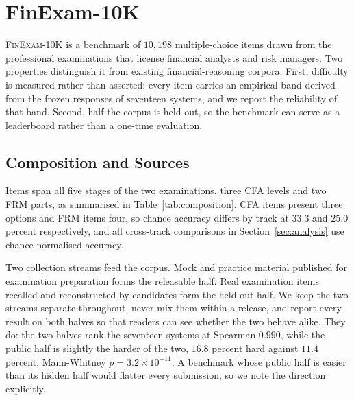 %
%
\newcommand{\pending}[1]{#1}   %

\section{FinExam-10K}
\label{sec:dataset}

\textsc{FinExam-10K} is a benchmark of $10{,}198$ multiple-choice items drawn from the
professional examinations that license financial analysts and risk managers. Two properties
distinguish it from existing financial-reasoning corpora. First, difficulty is measured rather
than asserted: every item carries an empirical band derived from the frozen responses of
seventeen systems, and we report the reliability of that band. Second, half the corpus is
held out, so the benchmark can serve as a leaderboard rather than a one-time evaluation.

\subsection{Composition and Sources}

Items span all five stages of the two examinations, three CFA levels and two FRM parts, as
summarised in Table~\ref{tab:composition}. CFA items present three options and FRM items four,
so chance accuracy differs by track at $33.3$ and $25.0$ percent respectively, and all
cross-track comparisons in Section~\ref{sec:analysis} use chance-normalised accuracy.

Two collection streams feed the corpus. Mock and practice material published for examination
preparation forms the releasable half. Real examination items recalled and reconstructed by
candidates form the held-out half. We keep the two streams separate throughout, never mix
them within a release, and report every result on both halves so that readers can see whether
the two behave alike. They do: the two halves rank the seventeen systems at Spearman $0.990$,
while the public half is slightly the harder of the two, $16.8$ percent hard against $11.4$
percent, Mann-Whitney $p=3.2\times10^{-11}$. A benchmark whose public half is easier than its
hidden half would flatter every submission, so we note the direction explicitly.

